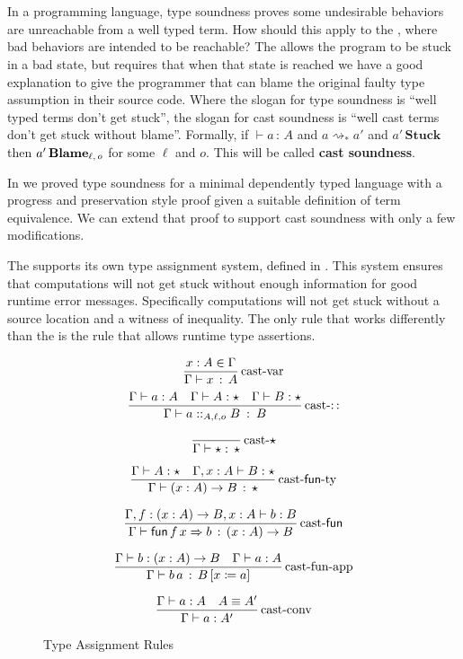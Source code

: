 \section{\CSys{}}
 
In a programming language, type soundness proves some undesirable behaviors are unreachable from a well typed term.
How should this apply to the \clang{}, where bad behaviors are intended to be reachable?
The \clang{} allows the program to be stuck in a bad state, but requires that when that state is reached we have a good explanation to give the programmer that can blame the original faulty type assumption in their source code.
Where the slogan for type soundness is ``well typed terms don't get stuck'', the slogan for cast soundness is ``well cast terms don't get stuck without blame''.
Formally, if $\vdash a\,:\,A$ and $a\rightsquigarrow_\ast a'$ and $a'\,\textbf{Stuck}$ then $a'\,\textbf{Blame}{}_{\ell,\,o}$ for some $\ell$ and $o$.
This will be called \textbf{cast soundness}.

In  we proved type soundness for a minimal dependently typed language with a progress and preservation style proof given a suitable definition of term equivalence.
We can extend that proof to support cast soundness with only a few modifications.
 
The \clang{} supports its own type assignment system, defined in .
This system ensures that computations will not get stuck without enough information for good runtime error messages.
Specifically computations will not get stuck without a source location and a witness of inequality.
The only rule that works differently than the \slang{} is the  rule that allows runtime type assertions.

\begin{figure}
\[
\frac{x:A\in \Gamma }{\Gamma \vdash x\,:\,A}
\operatorname{cast-var}
\]
\[
\frac{\Gamma \vdash a:A\quad \Gamma \vdash A:\star\quad \Gamma \vdash B:\star}{\Gamma \vdash a::_{A,\ell ,o}B\::\:B}
\operatorname{cast-::}
\]
 
\[
\frac{\,}{\Gamma \vdash\star:\,\star}
\operatorname{cast-\star}
\]
 
\[
\frac{\Gamma \vdash A:\star\quad \Gamma ,x:A\vdash B:\star}{\Gamma \vdash\left(x:A\right)\rightarrow B\,:\,\star}
\operatorname{cast-\mathsf{fun}-ty}
\]
 
\[
\frac{\Gamma ,f:\left(x:A\right)\rightarrow B,x:A\vdash b:B}{\Gamma \vdash\mathsf{fun}\,f\,x\Rightarrow b\,:\,\left(x:A\right)\rightarrow B}
\operatorname{cast-\mathsf{fun}}
\]
 
\[
\frac{\Gamma \vdash b:\left(x:A\right)\rightarrow B\quad \Gamma \vdash a:A}{\Gamma \vdash b\,a\,:\,B\left[x\coloneqq a\right]}
\operatorname{cast-fun-app}
\]
 
\[
\frac{\Gamma \vdash a:A\quad A\equiv A'}{\Gamma \vdash a:A'}
\operatorname{cast-conv}
\]
\caption{\CLang{} Type Assignment Rules}
\label{fig:cast-tas-rules}
\end{figure}

